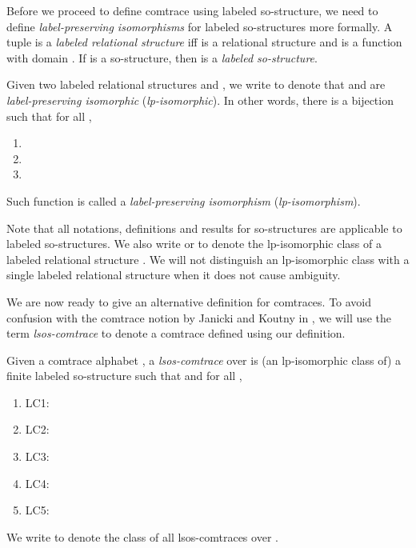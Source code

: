 \documentclass{llncs}
\begin{document}
Before we proceed to define comtrace using labeled so-structure, we need to define  \textit{label-preserving isomorphisms} for labeled so-structures more formally. A tuple  is a \textit{labeled relational structure} iff  is a relational structure and  is a function with domain . If  is a so-structure, then  is a \textit{labeled so-structure}.

\begin{definition} Given two labeled relational structures  and , we write  to denote that  and  are  \emph{label-preserving isomorphic} (\emph{lp-isomorphic}). In other words, there is a bijection  such that for all , 
\begin{enumerate}
\item 
\item 
\item 
\end{enumerate}
Such function  is called a \emph{label-preserving isomorphism} (\emph{lp-isomorphism}). \EOD
\end{definition}

Note that all notations, definitions and results for so-structures are applicable to labeled so-structures. We also write  or  to denote the lp-isomorphic class of a labeled relational structure . We  will not distinguish  an lp-isomorphic class  with a single labeled relational structure  when it does not cause ambiguity.



We are now ready to give an alternative definition for comtraces. To avoid confusion with the comtrace notion by Janicki and Koutny in \cite{JK95}, we will use the term \emph{lsos-comtrace} to denote a comtrace defined using our definition.

\begin{definition} Given a comtrace alphabet , a \emph{lsos-comtrace} over  is (an lp-isomorphic class of) a finite labeled so-structure  such that   and for all ,
\begin{enumerate}
\item[] \textsf{LC1:\mbox{\hspace{5mm}}} 
\item[] \textsf{LC2:\mbox{\hspace{5mm}}} 
\item[] \textsf{LC3:\mbox{\hspace{5mm}}} 
\item[] \textsf{LC4:\mbox{\hspace{5mm}}} 
\item[] \textsf{LC5:\mbox{\hspace{5mm}}}  
\end{enumerate}
We write  to denote the class of all lsos-comtraces over . \EOD
\label{def:lcomtrace}
\end{definition}
\end{document}
